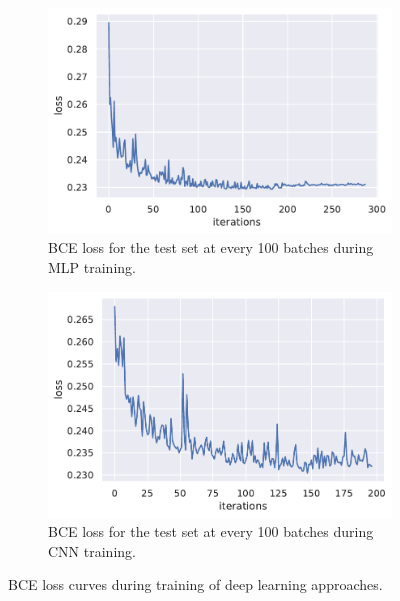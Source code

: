 \documentclass[runningheads]{llncs}
\begin{document}
\begin{figure}[h]
     \centering
     \begin{subfigure}[b]{0.49\textwidth}
         \centering
        \includegraphics[width=\textwidth]{images/train_loss_lin.pdf}
        \caption{BCE loss for the test set at every 100 batches during MLP training.}

     \end{subfigure}
     \hfill
     \begin{subfigure}[b]{0.49\textwidth}
         \centering
    \includegraphics[width=\textwidth]{images/train_loss_conv.pdf}
    \caption{BCE loss for the test set at every 100 batches during CNN training.}

    \end{subfigure}
    \caption{BCE loss curves during training of deep learning approaches.}

    \label{fig:train_loss_fcn-cnn}
\end{figure}
\end{document}

